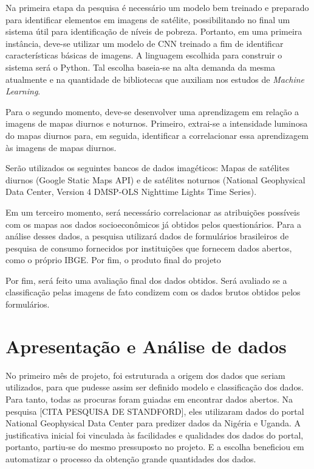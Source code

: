 \documentclass[]{article}
\begin{document}
Na primeira etapa da pesquisa é necessário um modelo bem treinado e preparado para identificar elementos em imagens de satélite, possibilitando no final um sistema útil para identificação de níveis de pobreza. Portanto, em uma primeira instância, deve-se utilizar um modelo de CNN treinado a fim de identificar características básicas de imagens. A linguagem escolhida para construir o sistema será o Python. Tal escolha baseia-se na alta demanda da mesma atualmente e na quantidade de bibliotecas que auxiliam nos estudos de \textit{Machine Learning}.

Para o segundo momento, deve-se desenvolver uma aprendizagem em relação a imagens de mapas diurnos e noturnos. Primeiro, extrai-se a intensidade luminosa do mapas diurnos para, em seguida, identificar a correlacionar essa aprendizagem às imagens de mapas diurnos. 

Serão utilizados os seguintes bancos de dados imagéticos: Mapas de satélites diurnos (Google Static Maps API) e de satélites noturnos (National Geophysical Data Center, Version 4 DMSP-OLS Nighttime Lights Time Series).

Em um terceiro momento, será necessário correlacionar as atribuições possíveis com os mapas aos dados socioeconômicos já obtidos pelos questionários. Para a análise desses dados, a pesquisa utilizará dados de formulários brasileiros de pesquisa de consumo fornecidos por instituições que fornecem dados abertos, como o próprio IBGE. Por fim, o produto final do projeto   

Por fim, será feito uma avaliação final dos dados obtidos. Será avaliado se a classificação pelas imagens de fato condizem com os dados brutos obtidos pelos formulários.

\section{Apresentação e Análise de dados}
No primeiro mês de projeto, foi estruturada a origem dos dados que seriam utilizados, para que pudesse assim ser definido modelo e classificação dos dados. Para tanto, todas as procuras foram guiadas em encontrar dados abertos. Na pesquisa [CITA PESQUISA DE STANDFORD], eles utilizaram dados do portal National Geophysical Data Center para predizer dados da Nigéria e Uganda. A justificativa inicial foi vinculada às facilidades e qualidades dos dados do portal, portanto, partiu-se do mesmo pressuposto no projeto. E a escolha beneficiou em automatizar o processo da obtenção grande quantidades dos dados.
\end{document}
